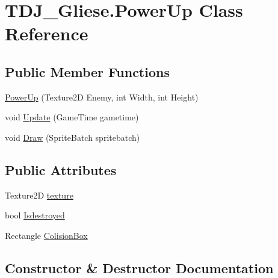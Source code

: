 \hypertarget{class_t_d_j___gliese_1_1_power_up}{}\section{T\+D\+J\+\_\+\+Gliese.\+Power\+Up Class Reference}
\label{class_t_d_j___gliese_1_1_power_up}
\subsection*{Public Member Functions}
\begin{DoxyCompactItemize}
\item 
\hyperlink{class_t_d_j___gliese_1_1_power_up_af748c62a6501f8fedcf130ac1c32834f}{Power\+Up} (Texture2D Enemy, int Width, int Height)
\item 
void \hyperlink{class_t_d_j___gliese_1_1_power_up_a2b15d72dcb58cbc354e386664b7bc8e0}{Update} (Game\+Time gametime)
\item 
void \hyperlink{class_t_d_j___gliese_1_1_power_up_ac46db01ba96c843eeeabfa649bd09c12}{Draw} (Sprite\+Batch spritebatch)
\end{DoxyCompactItemize}
\subsection*{Public Attributes}
\begin{DoxyCompactItemize}
\item 
Texture2D \hyperlink{class_t_d_j___gliese_1_1_power_up_a574052ea0c87264da315ee0e3f9259c3}{texture}
\item 
bool \hyperlink{class_t_d_j___gliese_1_1_power_up_af4ff6682145e48f9a65c9905ceaf6d4f}{Isdestroyed}
\item 
Rectangle \hyperlink{class_t_d_j___gliese_1_1_power_up_a0d85f59ad9a8c0150ffb5ce36764a69d}{Colision\+Box}
\end{DoxyCompactItemize}


\subsection{Constructor \& Destructor Documentation}
\mbox{\label{class_t_d_j___gliese_1_1_power_up_af748c62a6501f8fedcf130ac1c32834f}} 
